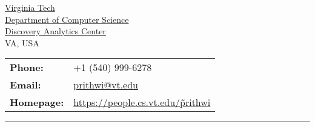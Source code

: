 
 
\begin{center}
{\Large {\name} }
\end{center}

\begin{minipage}{0.50\linewidth}
  \href{http://www.vt.edu/}{Virginia Tech} \\
  \href{http://www.cs.vt.edu/}{Department of Computer Science} \\
  \href{http://dac.cs.vt.edu/}{Discovery Analytics Center} \\
  VA, USA\\
\end{minipage}
\begin{minipage}{0.50\linewidth}
  \begin{tabular}{ll}
    \textbf{Phone:} & +1 (540) 999-6278 \\
    \textbf{Email:} & \href{mailto:prithwi@vt.edu}{prithwi@vt.edu} \\
    \textbf{Homepage:} & \href{https://people.cs.vt.edu/~prithwi}{https://people.cs.vt.edu/\~prithwi} \\
  \end{tabular}
\end{minipage}
\hrule
\vspace{2em}


